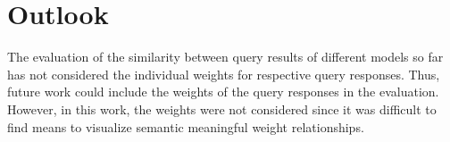 \section{Outlook}\label{sec:outlook}



The evaluation of the similarity between query results of different models so far has not considered the individual weights for respective query responses.
Thus, future work could include the weights of the query responses in the evaluation.
However, in this work, the weights were not considered since it was difficult to find means to visualize semantic meaningful weight relationships.




